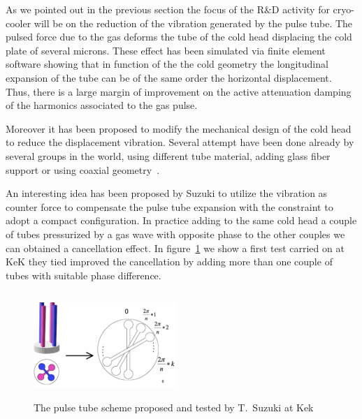 As we pointed out in the previous section the focus of the R\&D activity for cryo-cooler will be on the reduction of the vibration generated by the pulse tube.
The pulsed force due to the gas deforms the tube of the cold head displacing the cold plate of several microns. These effect has been simulated via finite element software showing that in function of the the cold geometry the longitudinal expansion of the tube can be of the same order the horizontal displacement.  Thus, there is a large margin of improvement on the active attenuation damping of the harmonics associated to the gas pulse.  

Moreover  it has been proposed to modify the mechanical design of the cold head to  reduce the displacement vibration. Several attempt have been done already by several groups in the world, using different tube material, adding glass fiber support or using coaxial geometry~\cite{Koettig}.

An interesting idea has been proposed by Suzuki  to utilize the vibration as counter force to compensate the pulse tube expansion with the constraint to adopt a compact configuration. In practice adding to the same cold head  a couple of tubes  pressurized by a  gas wave with opposite  phase  to the other couples we can obtained a cancellation effect.
In figure~\ref{fig:Suzuki} we show a first test carried on at KeK they tied improved  the cancellation  by adding more than one couple of tubes with suitable phase difference. 

\begin{figure}[htbp]
\begin{center}
\includegraphics[width=5.4cm, height=4cm] {./Sec_SiteInfra/Figures/Suzuki.pdf}
\caption{The pulse tube scheme proposed and tested by T.~Suzuki at Kek~\cite{Suzuki_2006}}
\label{fig:Suzuki}
\end{center}
\end{figure}



